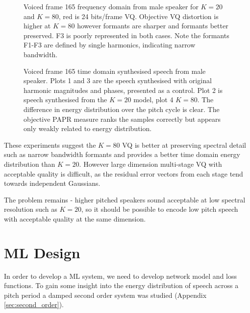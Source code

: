\documentclass{article}
\begin{document}
\begin{figure}
\caption{Voiced frame 165 frequency domain from male speaker for $K=20$ and $K=80$, red is 24 bits/frame VQ. Objective VQ distortion is higher at $K=80$ however formants are sharper and formants better preserved.  F3 is poorly represented in both cases.  Note the formants F1-F3 are defined by single harmonics, indicating narrow bandwidth.}
\label{fig:big_dog_f165_freq}
\begin{center}


\end{center}
\end{figure}

\begin{figure}
\caption{Voiced frame 165 time domain synthesised speech from male speaker.  Plots 1 and 3 are the speech synthesised with original harmonic magnitudes and phases, presented as a control.  Plot 2 is speech synthesised from the $K=20$ model, plot 4 $K=80$. The difference in energy distribution over the pitch cycle is clear.  The objective PAPR measure ranks the samples correctly but appears only weakly related to energy distribution.}
\label{fig:big_dog_f165_time}
\begin{center}


\end{center}
\end{figure}

These experiments suggest the $K=80$ VQ is better at preserving spectral detail such as narrow bandwidth formants and provides a better time domain energy distribution than $K=20$.  However large dimension multi-stage VQ with acceptable quality is difficult, as the residual error vectors from each stage tend towards independent Gaussians.

The problem remains - higher pitched speakers sound acceptable at low spectral resolution such as $K=20$, so it should be possible to encode low pitch speech with acceptable quality at the same dimension.

\section{ML Design}

In order to develop a ML system, we need to develop network model and loss functions. To gain some insight into the energy distribution of speech across a pitch period a damped second order system was studied (Appendix \ref{sec:second_order}).
\end{document}
